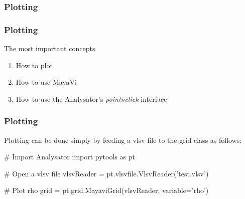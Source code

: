 \documentclass{beamer}
\begin{document}
\begin{frame}
 \frametitle{Plotting}
 \begin{center}
 \scalebox{0.8} {
 }
 \end{center}
\end{frame}

\begin{frame}
 \frametitle{Plotting}
 The most important concepts
 \begin{enumerate}
  \item How to plot
  \item How to use MayaVi
  \item How to use the Analysator's \emph{pointnclick} interface
 \end{enumerate}
\end{frame}

\begin{frame}[fragile]
 \frametitle{Plotting}
 \begin{center}
 \end{center}
 Plotting can be done simply by feeding a vlsv file to the grid class as follows:
 \begin{python}[basicstyle=\tiny]
  # Import Analysator
  import pytools as pt
  
  # Open a vlsv file
  vlsvReader = pt.vlsvfile.VlsvReader('test.vlsv')
  
  # Plot rho
  grid = pt.grid.MayaviGrid(vlsvReader, variable='rho')
 \end{python}
\end{frame}
\end{document}
